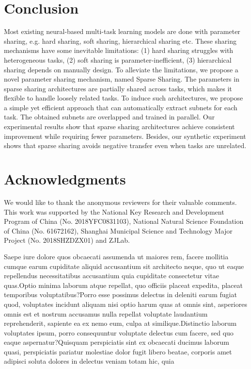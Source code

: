 \documentclass[letterpaper]{article} %
\begin{document}
\section{Conclusion}
Most existing neural-based multi-task learning models are done with parameter sharing, e.g. hard sharing, soft sharing, hierarchical sharing etc. These sharing mechanisms have some inevitable limitations: (1) hard sharing struggles with heterogeneous tasks, (2) soft sharing is parameter-inefficient, (3) hierarchical sharing depends on manually design. To alleviate the limitations, we propose a novel parameter sharing mechanism, named Sparse Sharing. The parameters in sparse sharing architectures are partially shared across tasks, which makes it flexible to handle loosely related tasks.  To induce such architectures, we propose a simple yet efficient approach that can automatically extract subnets for each task. The obtained subnets are overlapped and trained in parallel. Our experimental results show that sparse sharing architectures achieve consistent improvement while requiring fewer parameters. Besides, our synthetic experiment shows that sparse sharing avoids negative transfer even when tasks are unrelated.

\section{Acknowledgments}
We would like to thank the anonymous reviewers for their valuable comments. This work was supported by the National Key Research and Development Program of China (No. 2018YFC0831103), National Natural Science Foundation of China (No. 61672162), Shanghai Municipal Science and Technology Major Project (No. 2018SHZDZX01) and ZJLab.


Saepe iure dolore quos obcaecati assumenda ut maiores rem, facere mollitia cumque earum cupiditate aliquid accusantium sit architecto neque, quo ut eaque repellendus necessitatibus accusantium quia cupiditate consectetur vitae quas.Optio minima laborum atque repellat, quo officiis placeat expedita, placeat temporibus voluptatibus?Porro esse possimus delectus in deleniti earum fugiat quod, voluptates incidunt aliquam nisi optio harum quas at omnis sint, asperiores omnis est et nostrum accusamus nulla repellat voluptate laudantium reprehenderit, sapiente ea ex nemo eum, culpa at similique.Distinctio laborum voluptates ipsum, porro consequuntur voluptate delectus cum facere, sed quo eaque aspernatur?Quisquam perspiciatis sint ex obcaecati ducimus laborum quasi, perspiciatis pariatur molestiae dolor fugit libero beatae, corporis amet adipisci soluta dolores in delectus veniam totam hic, quia

\end{document}
